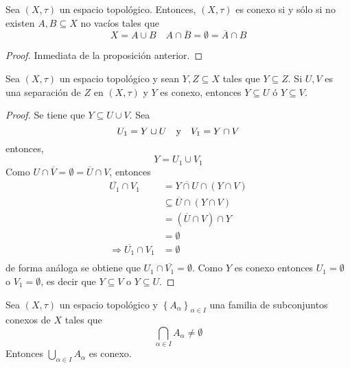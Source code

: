 \documentclass[12pt]{report}
\theoremstyle{largebreak}
\newcommand{\Cls}[1]{\ensuremath{\overline{#1}}}
\begin{document}
    \begin{cor}
        Sea $(X,\tau)$ un espacio topológico. Entonces, $(X,\tau)$ es conexo si y sólo si no existen $A,B\subseteq X$ no vacíos tales que
        \begin{equation*}
            X=A\cup B\quad A\cap \Cls{B}=\emptyset=\Cls{A}\cap B
        \end{equation*}
    \end{cor}

    \begin{proof}
        Inmediata de la proposición anterior.
    \end{proof}

    \begin{propo}
        Sea $(X,\tau)$ un espacio topológico y sean $Y,Z\subseteq X$ tales que $Y\subseteq Z$. Si $U,V$ es una separación de $Z$ en $(X,\tau)$ y $Y$ es conexo, entonces $Y\subseteq U$ ó $Y\subseteq V$.
    \end{propo}

    \begin{proof}
        Se tiene que $Y\subseteq U\cup V$. Sea
        \begin{equation*}
            U_1=Y\cup U\quad\textup{y}\quad V_1=Y\cap V
        \end{equation*}
        entonces,
        \begin{equation*}
            Y=U_1\cup V_1
        \end{equation*}
        Como $U\cap\Cls{V}=\emptyset=\Cls{U}\cap V$, entonces
        \begin{equation*}
            \begin{split}
                \Cls{U_1}\cap V_1&=\Cls{Y\cap U}\cap (Y\cap V)\\
                &\subseteq\Cls{U}\cap (Y\cap V)\\
                &=(\Cls{U}\cap V)\cap Y\\
                &=\emptyset\\
                \Rightarrow \Cls{U_1}\cap V_1&=\emptyset\\
            \end{split}
        \end{equation*}
        de forma análoga se obtiene que $U_1\cap\Cls{V_1}=\emptyset$. Como $Y$ es conexo entonces $U_1=\emptyset$ o $V_1=\emptyset$, es decir que $Y\subseteq V$ o $Y\subseteq U$.
    \end{proof}

    \begin{propo}
        Sea $(X,\tau)$ un espacio topológico y $\left\{A_\alpha\right\}_{\alpha\in I}$ una familia de subconjuntos conexos de $X$ tales que
        \begin{equation*}
            \bigcap_{\alpha\in I}A_\alpha\neq\emptyset
        \end{equation*}
        Entonces $\bigcup_{\alpha\in I}A_\alpha$ es conexo.
    \end{propo}
\end{document}
